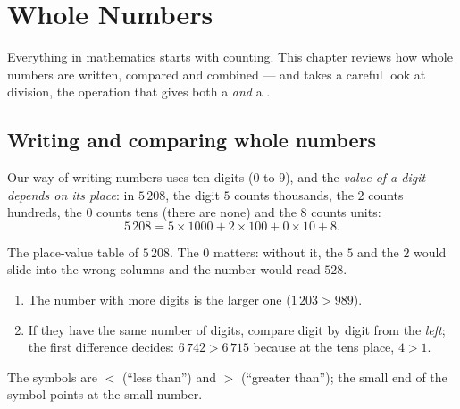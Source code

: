 \chapter{Whole Numbers}\label{ch:g6:wholes}

Everything in mathematics starts with counting. This chapter reviews how
whole numbers are written, compared and combined --- and takes a careful
look at division, the operation that gives both a  \emph{and} a
.

\section{Writing and comparing whole numbers}

\begin{definition}\label{def:g6:wholes:place}
Our way of writing numbers uses ten digits ($0$ to $9$), and the
\emph{value of a digit depends on its place}: in
$5\,208$, the digit $5$ counts thousands, the $2$ counts hundreds, the
$0$ counts tens (there are none) and the $8$ counts units:
\[
5\,208 = 5 \times 1000 + 2 \times 100 + 0 \times 10 + 8 .
\]
\end{definition}

\begin{omfigure}

{\small The place-value table of $5\,208$. The $0$ matters: without it,
the $5$ and the $2$ would slide into the wrong columns and the number
would read $528$.}
\end{omfigure}

\begin{method}\label{met:g6:wholes:compare}
\begin{enumerate}
  \item The number with more digits is the larger one
        ($1\,203 > 989$).
  \item If they have the same number of digits, compare digit by digit
        from the \emph{left}; the first difference decides:
        $6\,742 > 6\,715$ because at the tens place, $4 > 1$.
\end{enumerate}
The symbols are $<$ (``less than'') and $>$ (``greater than''); the
small end of the symbol points at the small number.
\end{method}

